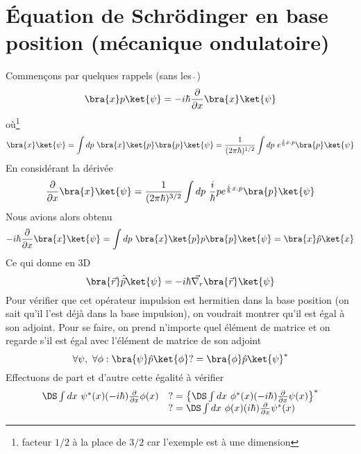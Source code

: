 	

\section{Équation de Schrödinger en base position (mécanique ondulatoire)}
Commençons par quelques rappels (sans les $\hat{\ }$)
\begin{equation}
\bra{x}p\ket{\psi} = -i\hbar \frac{\partial}{\partial x}\bra{x}\ket{\psi}
\end{equation}
où\footnote{facteur $1/2$ à la place de $3/2$ car l'exemple est à une dimension}
\begin{equation}
\bra{x}\ket{\psi} = \int dp\ \bra{x}\ket{p}\bra{p}\ket{\psi} = \frac{1}{(2\pi\hbar)^{1/2}}
\int dp\ e^{\frac{i}{\hbar}x.p}\bra{p}\ket{\psi}
\end{equation}
En considérant la dérivée
\begin{equation}
\frac{\partial}{\partial x}\bra{x}\ket{\psi} = \frac{1}{(2\pi\hbar)^{3/2}}\int dp\ \frac{i}{\hbar}p
e^{\frac{i}{\hbar}x.p}\bra{p}\ket{\psi}
\end{equation}
Nous avions alors obtenu
\begin{equation}
-i\hbar\frac{\partial}{\partial x}\bra{x}\ket{\psi} = \int dp\ \bra{x}\ket{p}p\bra{p}\ket{\psi} = 
\bra{x}\hat{p}\ket{x}
\end{equation}
Ce qui donne en 3D
\begin{equation}
\bra{\vec{r}}\hat{\vec{p}}\ket{\psi} = -i\hbar\vec{\nabla_r}\bra{\vec{r}}\ket{\psi}
\end{equation}
Pour vérifier que cet opérateur impulsion est hermitien dans la base position (on sait qu'il
l'est déjà dans la base impulsion), on voudrait montrer qu'il est égal à son 
adjoint. Pour se faire, on prend n'importe quel élément de matrice et on regarde s'il est égal avec
l'élément de matrice de son adjoint
\begin{equation}
\forall\psi,\ \forall \phi : \bra{\psi}\hat{p}\ket{\phi} ?= \bra{\phi}\hat{p}\ket{\psi}^*
\end{equation}
Effectuons de part et d'autre cette égalité à vérifier
\begin{equation}
\begin{array}{ll}
\DS \int dx\ \psi^*(x)(-i\hbar)\frac{\partial}{\partial x}\phi(x) &?= \left\{\DS \int dx\ \phi^*(x)(-i\hbar)
\frac{\partial}{\partial x}\psi(x)\right\}^*\\
&?=\DS \int dx\ \phi(x)(i\hbar)\frac{\partial}{\partial x}\psi^*(x)
\end{array}
\end{equation}
